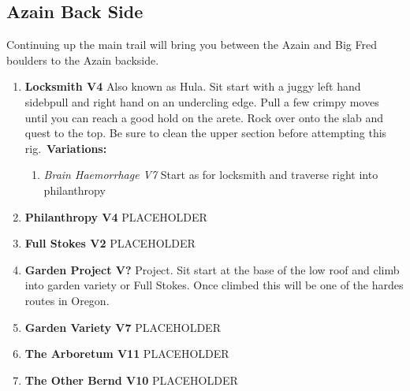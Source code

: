 \subsection*{Azain Back Side}\label{bf:Azain Back Side}
Continuing up the main trail will bring you between the Azain and Big Fred boulders to the Azain backside.

\begin{enumerate}[resume]
	\item\label{rt:Locksmith} \colorbox{RoyalBlue!20}{\textbf{Locksmith V4     \warn \warn } }
	\newline Also known as Hula. Sit start with a juggy left hand sidebpull and right hand on an undercling edge. Pull a few crimpy moves until you can reach a good hold on the arete. Rock over onto the slab and quest to the top. Be sure to clean the upper section before attempting this rig.\
	\newline \textbf{Variations:}
	\begin{enumerate}
		\item\label{vr:Brain Haemorrhage} \colorbox{Goldenrod!50}{\emph{Brain Haemorrhage V7  }  }
		\newline Start as for locksmith and traverse right into philanthropy\
	\end{enumerate}
	\item\label{rt:Philanthropy} \colorbox{RoyalBlue!20}{\textbf{Philanthropy V4  } }
	\newline PLACEHOLDER\
	\item\label{rt:Full Stokes} \colorbox{green!20}{\textbf{Full Stokes V2  } }
	\newline PLACEHOLDER\
	\item\label{rt:Garden Project} \colorbox{black!20}{\textbf{Garden Project V?  } }
	\newline Project. Sit start at the base of the low roof and climb into garden variety or Full Stokes. Once climbed this will be one of the hardes routes in Oregon.\
	\item\label{rt:Garden Variety} \colorbox{Goldenrod!50}{\textbf{Garden Variety V7  } }
	\newline PLACEHOLDER\
	\item\label{rt:The Arboretum} \colorbox{red!20}{\textbf{The Arboretum V11  } }
	\newline PLACEHOLDER\
	\item\label{rt:The Other Bernd} \colorbox{red!20}{\textbf{The Other Bernd V10  } }
	\newline PLACEHOLDER\

\end{enumerate}
